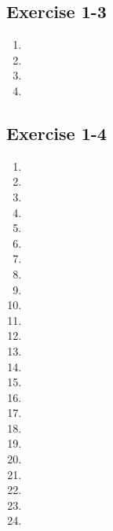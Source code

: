 \subsection{Exercise 1-3} %

\begin{enumerate}[itemsep=5pt, label=\textbf{\arabic*}. ]
\item %
\item %
\item %
\item %

\end{enumerate}

\subsection{Exercise 1-4} %

\begin{multicols}{2}
\begin{enumerate}[label=\textbf{\arabic*}., itemsep=5pt]
\item %
\item %
\item %
\item %
\item %
\item %
\item %
\item %
\item %
\item %
\item %
\item %
\item %
\item %
\item %
\item %
\item %
\item %
\item %
\item %
\item %
\item %
\item %
\item %
\end{enumerate}
\end{multicols}
